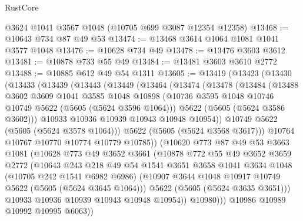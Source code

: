 \begin{lexlean}{RustCore}
\begin{coremodule}
    @3624
    @1041
    @3567
    @1048
    (@10705 @699 @3087 @12354 @12358)
@13468 := @10643 @734 @87 @49 @53
@13474 := @13468 @3614 @1064 @1081 @1041 @3577 @1048
@13476 := @10628 @734 @49
@13478 := @13476 @3603 @3612
@13481 := @10878 @733 @55 @49
@13484 := @13481 @3603 @3610 @2772
@13488 := @10885 @612 @49 @54 @1311
@13605 := @13419
    (@13423
      (@13430
        (@13433
          (@13439
            (@13443
              (@13449
                (@13464
                  (@13474
                    (@13478
                      (@13484
                        (@13488
                          @3602
                          @3609
                          @1041
                          @3585
                          @1048
                          @10898
                          (@10736 @3595 @1048 @10746 @10749 @5622 (@5605 (@5624 @3596 @1064)))
                          @5622
                          (@5605 (@5624 @3586 @3602)))
                        @10933
                        @10936
                        @10939
                        @10943
                        @10948
                        @10954))
                    @10749
                    @5622
                    (@5605 (@5624 @3578 @1064)))
                  @5622
                  (@5605 (@5624 @3568 @3617)))
                @10764
                @10767
                @10770
                @10774
                @10779
                @10785))
            (@10620
              @773
              @87
              @49
              @53
              @3663
              @1081
              (@10628
                @773
                @49
                @3652
                @3661
                (@10878
                  @772
                  @55
                  @49
                  @3652
                  @3659
                  @2772
                  (@10643
                    @243
                    @218
                    @49
                    @54
                    @1541
                    @3651
                    @3658
                    @1041
                    @3634
                    @1048
                    (@10705 @242 @1541 @6982 @6986)
                    (@10907 @3644 @1048 @10917 @10749 @5622 (@5605 (@5624 @3645 @1064)))
                    @5622
                    (@5605 (@5624 @3635 @3651)))
                  @10933
                  @10936
                  @10939
                  @10943
                  @10948
                  @10954))
              @10980)))
        @10986
        @10989
        @10992
        @10995
        @6063))

\end{coremodule}
\end{lexlean}
